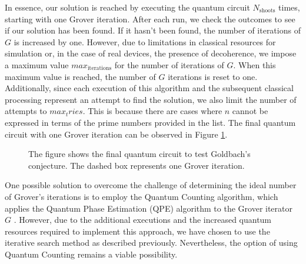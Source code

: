 \documentclass[aps,prapplied,longbibliography]{article}
\begin{document}
    In essence, our solution is reached by executing the quantum circuit $N_{\text{shoots}}$ times, starting with one Grover iteration. After each run, we check the outcomes to see if our solution has been found. If it hasn't been found, the number of iterations of $G$ is increased by one. However, due to limitations in classical resources for simulation or, in the case of real devices, the presence of decoherence, we impose a maximum value $max_{\text{iterations}}$ for the number of iterations of $G$. When this maximum value is reached, the number of $G$ iterations is reset to one. Additionally, since each execution of this algorithm and the subsequent classical processing represent an attempt to find the solution, we also limit the number of attempts to $max_tries$. This is because there are cases where $n$ cannot be expressed in terms of the prime numbers provided in the list. The final quantum circuit with one Grover iteration can be observed in Figure \ref{fig:QCG}.

    \begin{figure}[h]
        \centering
        \caption{The figure shows the final quantum circuit to test Goldbach's conjecture. The dashed box represents one Grover iteration.}
        \label{fig:QCG}
    \end{figure}

    One possible solution to overcome the challenge of determining the ideal number of Grover's iterations is to employ the Quantum Counting algorithm, which applies the Quantum Phase Estimation (QPE) algorithm to the Grover iterator $G$ \cite{brassard1998quantum}. However, due to the additional executions and the increased quantum resources required to implement this approach, we have chosen to use the iterative search method as described previously. Nevertheless, the option of using Quantum Counting remains a viable possibility.
\end{document}
